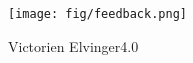 \documentclass[xcolor=table,t]{beamer}
\begin{document}
\begin{frame}[plain]
    \begin{minipage}[c][.9\textheight][t]{\textwidth}
        \centering
        \vspace{0.2\textheight}
        \texttt{[image: fig/feedback.png]}%
    \end{minipage}
    \begin{minipage}{\textwidth}
        \centering
        Victorien Elvinger\hspace{.5em}\ccby\hspace{3pt}4.0
    \end{minipage}
\end{frame}
\end{document}
